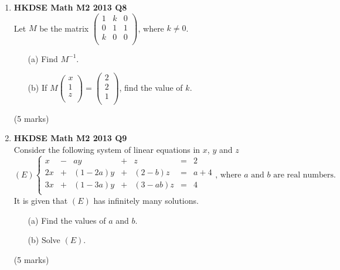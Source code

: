\documentclass[12pt]{article}
\begin{document}
\begin{enumerate}
	\item \textbf{HKDSE Math M2 2013 Q8}\\
	Let $M$ be the matrix $\begin{pmatrix}
		1 & k & 0\\
		0 & 1 & 1\\
		k & 0 & 0\\
	\end{pmatrix}$, where $k \neq 0$. 
	\begin{enumerate}
		\item [(a)]Find $M^{-1}$. 
		\item [(b)]If $M\begin{pmatrix}
		x\\
		1\\
		z\\
	\end{pmatrix} = \begin{pmatrix}
		2\\
		2\\
		1\\
	\end{pmatrix}$, find the value of $k$.
	\end{enumerate}
	(5 marks)

	\item \textbf{HKDSE Math M2 2013 Q9}\\
	Consider the following system of linear equations in $x$, $y$ and $z$
		$$(E)  \left\{\begin{matrix}
		x & - & ay & + & z & = & 2\\
		2x & + & (1-2a)y & + & (2-b)z  & =  & a+4\\
		3x & + & (1-3a)y & + & (3-ab)z & = & 4\\
		\end{matrix}\right.\text{, where }a\text{ and }b\text{ are real numbers.}$$
		It is given that $(E)$ has infinitely many solutions.
	\begin{enumerate}
		\item [(a)]Find the values of $a$ and $b$.
		\item [(b)]Solve $(E)$.
	\end{enumerate}
	(5 marks)



\end{enumerate}
\end{document}
